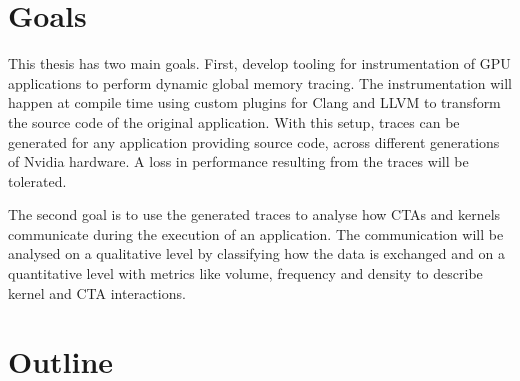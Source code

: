 %	
\section{Goals}
This thesis has two main goals. First, develop tooling for instrumentation of GPU applications to perform dynamic global memory tracing. The instrumentation will happen at compile time using custom plugins for Clang and LLVM to transform the source code of the
original application. With this setup, traces can be generated for any application providing source code,
across different generations of Nvidia hardware. A loss in performance resulting from the traces will be tolerated.

The second goal is to use the generated traces to analyse how CTAs and kernels communicate during the execution of an application. The communication will be analysed on a qualitative level by classifying how the data is exchanged and on a quantitative level with metrics like volume, frequency and density to describe kernel and CTA interactions.


\section{Outline}
